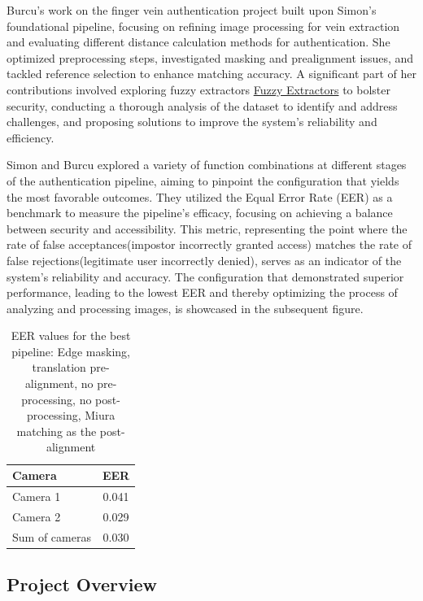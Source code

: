 Burcu's work on the finger vein authentication project built upon Simon's foundational pipeline, focusing on refining image processing for vein extraction and evaluating different distance calculation methods for authentication. She optimized preprocessing steps, investigated masking and prealignment issues, and tackled reference selection to enhance matching accuracy. A significant part of her contributions involved exploring fuzzy extractors \hyperref[def:Fuzzy_Extractors]{Fuzzy Extractors} to bolster security, conducting a thorough analysis of the dataset to identify and address challenges, and proposing solutions to improve the system's reliability and efficiency.

Simon and Burcu explored a variety of function combinations at different stages of the authentication pipeline, aiming to pinpoint the configuration that yields the most favorable outcomes. They utilized the Equal Error Rate (EER) as a benchmark to measure the pipeline's efficacy, focusing on achieving a balance between security and accessibility. This metric, representing the point where the rate of false acceptances(impostor incorrectly granted access) matches the rate of false rejections(legitimate user incorrectly denied), serves as an indicator of the system's reliability and accuracy. The configuration that demonstrated superior performance, leading to the lowest EER and thereby optimizing the process of analyzing and processing images, is showcased in the subsequent figure.

\begin{table}[H]
    \centering
    \caption{EER values for the best pipeline: Edge masking, translation pre-alignment, no pre-processing, no post-
    processing, Miura matching as the post-alignment}
    \begin{tabular}{lc}
    \toprule
    Camera & EER \\
    \midrule
    Camera 1 & 0.041 \\
    Camera 2 & 0.029 \\
    Sum of cameras & 0.030 \\
    \bottomrule
    \end{tabular}
    \label{tab:eervalues_best}
\end{table}

\subsection{Project Overview}

